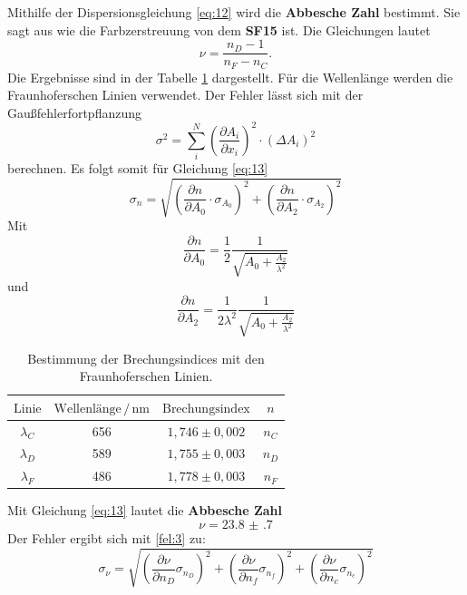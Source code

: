 Mithilfe der Dispersionsgleichung \ref{eq:12} wird die \textbf{Abbesche Zahl} bestimmt.
Sie sagt aus wie die Farbzerstreuung von dem \textbf{SF15} ist.
Die Gleichungen lautet
\begin{equation}
  \nu = \frac{n_D -1}{n_F-n_C}.
  \label{eq:13}
\end{equation}
Die Ergebnisse sind in der Tabelle \ref{tab:3}
dargestellt. Für die Wellenlänge werden die Fraunhoferschen Linien verwendet.
Der Fehler lässt sich mit der Gaußfehlerfortpflanzung
\begin{equation}
  \sigma^2 = \sum_i^N (\frac{\partial A_i}{\partial x_i})^2 \cdot (\Delta A_i)^2
  \label{fel:3}
\end{equation}
berechnen.
Es folgt somit für Gleichung \ref{eq:13}
\begin{equation*}
  \sigma_{n} = \sqrt{(\frac{\partial n}{\partial A_0} \cdot \sigma_{A_0})^2 + (\frac{\partial n}{\partial A_2} \cdot \sigma_{A_2})^2}
\end{equation*}
Mit
\begin{equation*}
  \frac{\partial n}{\partial A_0} = \frac{1}{2} \frac{1}{\sqrt{A_0 + \frac{A_2}{\lambda^2}}}
\end{equation*}
und
\begin{equation*}
  \frac{\partial n}{\partial A_2} = \frac{1}{2 \lambda^2} \frac{1}{\sqrt{A_0 + \frac{A_2}{\lambda^2}}}
\end{equation*}
\begin{table}[H]
  \centering
  \caption{Bestimmung der Brechungsindices mit den Fraunhoferschen Linien.}
  \label{tab:3}
  \begin{tabular}{c c c c }
    \toprule
    $\text{Linie}$ & $\text{Wellenlänge} \,/\,\si{\nano\meter}$ & $\text{Brechungsindex}$ &$n$\\
    \midrule
    $\lambda_C$ & 656 & $1,746 \pm 0,002$ & $n_C$\\
    $\lambda_D$ & 589 & $1,755 \pm 0,003$ & $n_D$\\
    $\lambda_F$ & 486 & $1,778 \pm 0,003$ & $n_F$\\
    \bottomrule
  \end{tabular}
\end{table}
Mit Gleichung \ref{eq:13} lautet die \textbf{Abbesche Zahl}
\begin{equation*}
  \nu = \num{23.8(7)}
\end{equation*}
Der Fehler ergibt sich mit \ref{fel:3} zu:
\begin{equation*}
  \sigma_\nu = \sqrt{(\frac{\partial \nu}{\partial n_D} \sigma_{n_D})^2 + (\frac{\partial \nu}{\partial n_f} \sigma_{n_f})^2 + (\frac{\partial \nu}{\partial n_c} \sigma_{n_c})^2}
\end{equation*}
